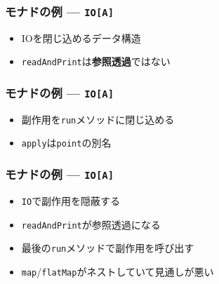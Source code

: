 \begin{frame}
  \frametitle{モナドの例 --- \protect\lstinline|IO[A]|}

  \begin{itemize}
    \item<2-> IOを閉じ込めるデータ構造
  \end{itemize}


  \begin{itemize}
    \item<4-> \lstinline|readAndPrint|は\textbf{参照透過}ではない
  \end{itemize}

\end{frame}

\begin{frame}
  \frametitle{モナドの例 --- \protect\lstinline|IO[A]|}

  

  \begin{itemize}
    \item<2-> 副作用を\lstinline|run|メソッドに閉じ込める
    \item<3-> \lstinline|apply|は\lstinline|point|の別名
  \end{itemize}
\end{frame}

\begin{frame}
  \frametitle{モナドの例 --- \protect\lstinline|IO[A]|}

  \begin{itemize}
    \item<1-> \lstinline|IO|で副作用を隠蔽する
  \end{itemize}


  \begin{itemize}
    \item<3-> \lstinline|readAndPrint|が参照透過になる
    \item<4-> 最後の\lstinline|run|メソッドで副作用を呼び出す
    \item<5-> \lstinline|map|/\lstinline|flatMap|がネストしていて見通しが悪い
  \end{itemize}
\end{frame}

